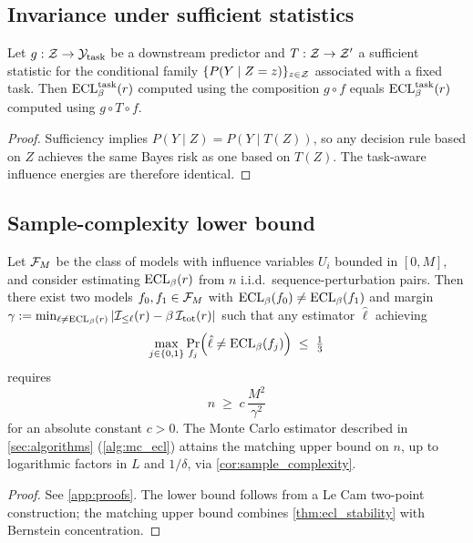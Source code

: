 \subsection{Invariance under sufficient statistics}

\begin{theorem}\label{thm:sufficient}
Let $g:\mathcal{Z}\to\mathcal{Y}_{\mathrm{task}}$ be a downstream predictor and $T:\mathcal{Z} \to \mathcal{Z}'$ a sufficient statistic for the conditional family $\{P(Y\mid Z = z)\}_{z\in\mathcal{Z}}$ associated with a fixed task. Then $\mathrm{ECL}^{\mathrm{task}}_\beta(r)$ computed using the composition $g \circ f$ equals $\mathrm{ECL}^{\mathrm{task}}_\beta(r)$ computed using $g \circ T \circ f$.
\end{theorem}
\begin{proof}
Sufficiency implies $P(Y \mid Z) = P(Y \mid T(Z))$, so any decision rule based on $Z$ achieves the same Bayes risk as one based on $T(Z)$. The task-aware influence energies are therefore identical.
\end{proof}

\subsection{Sample-complexity lower bound}

\begin{theorem}\label{thm:minimax}
Let $\mathcal{F}_M$ be the class of models with influence variables $U_i$ bounded in $[0,M]$, and consider estimating $\mathrm{ECL}_\beta(r)$ from $n$ i.i.d.\ sequence-perturbation pairs. Then there exist two models $f_0, f_1 \in \mathcal{F}_M$ with $\mathrm{ECL}_\beta(f_0) \neq \mathrm{ECL}_\beta(f_1)$ and margin $\gamma := \min_{\ell\neq \mathrm{ECL}_\beta(r)}\left\lvert \mathcal{I}_{\le \ell}(r) - \beta\,\mathcal{I}_{\mathrm{tot}}(r) \right\rvert$ such that any estimator $\hat{\ell}$ achieving
\[
\max_{j\in\{0,1\}}\Pr_{f_j}\!\left(\hat{\ell} \neq \mathrm{ECL}_\beta(f_j)\right) \;\le\; \tfrac{1}{3}
\]
requires
\[
n \;\ge\; c\,\frac{M^2}{\gamma^2}
\]
for an absolute constant $c > 0$. The Monte Carlo estimator described in \cref{sec:algorithms} (\cref{alg:mc_ecl}) attains the matching upper bound on $n$, up to logarithmic factors in $L$ and $1/\delta$, via \cref{cor:sample_complexity}.
\end{theorem}
\begin{proof}
See \cref{app:proofs}. The lower bound follows from a Le Cam two-point construction; the matching upper bound combines \cref{thm:ecl_stability} with Bernstein concentration.
\end{proof}
